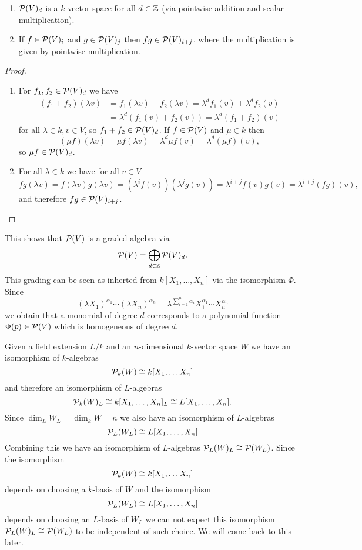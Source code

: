 \begin{lem}
 \begin{enumerate}[label=\emph{\alph*)},leftmargin=*]
  \item
   $\mathcal{P}(V)_d$ is a $k$-vector space for all $d \in \mathbb{Z}$ (via pointwise addition and scalar multiplication).
  \item
   If $f \in \mathcal{P}(V)_i$ and $g \in \mathcal{P}(V)_j$  then $fg \in \mathcal{P}(V)_{i+j}$, where the multiplication is given by pointwise multiplication.
 \end{enumerate}
\end{lem}
\begin{proof}
 \begin{enumerate}[label=\emph{\alph*)},leftmargin=*]
  \item For $f_1, f_2 \in \mathcal{P}(V)_d$ we have
   \begin{align*}
    (f_1+f_2)(\lambda v)
    &= f_1(\lambda v) + f_2(\lambda v)
    = \lambda^d f_1(v) + \lambda^d f_2(v) \\
    &= \lambda^d (f_1(v) + f_2(v))
    = \lambda^d (f_1 + f_2)(v)
   \end{align*}
   for all $\lambda \in k, v \in V$, so $f_1 + f_2 \in \mathcal{P}(V)_d$. If $f \in \mathcal{P}(V)$ and $\mu \in k$ then
   \[
    (\mu f)(\lambda v) = \mu f(\lambda v) = \lambda^d \mu f(v) = \lambda^d (\mu f)(v),
   \]
   so $\mu f \in \mathcal{P}(V)_d$.
  \item
   For all $\lambda \in k$ we have for all $v \in V$
   \[
    fg(\lambda v)
    = f(\lambda v) g(\lambda v)
    = \left(\lambda^i f(v)\right)\left(\lambda^j g(v)\right)
    = \lambda^{i+j} f(v) g(v)
    = \lambda^{i+j} (fg)(v),
   \]
   and therefore $fg \in \mathcal{P}(V)_{i+j}$.
  \qedhere
 \end{enumerate}
\end{proof}

This shows that $\mathcal{P}(V)$ is a graded algebra via
\[
  \mathcal{P}(V) = \bigoplus_{d \in \mathbb{Z}} \mathcal{P}(V)_d.
\]
This grading can be seen as inherted from $k[X_1, \dotsc, X_n]$ via the isomorphism $\Phi$. Since
\[
 (\lambda X_1)^{\alpha_1} \dotsm (\lambda X_n)^{\alpha_n}
 = \lambda^{\sum_{i=1}^n \alpha_i} X_1^{\alpha_1} \dotsm X_n^{\alpha_n}
\]
we obtain that a monomial of degree $d$ corresponds to a polynomial function $\Phi(p) \in \mathcal{P}(V)$ which is homogeneous of degree $d$.


Given a field extension $L/k$ and an $n$-dimensional $k$-vector space $W$ we have an isomorphism of $k$-algebras
\[
 \mathcal{P}_k(W) \cong k[X_1, \dotsc X_n]
\]
and therefore an isomorphism of $L$-algebras
\[
 \mathcal{P}_k(W)_L \cong k[X_1, \dotsc, X_n]_L \cong L[X_1, \dotsc, X_n].
\]
Since $\dim_L W_L = \dim_k W = n$ we also have an isomorphism of $L$-algebras
\[
 \mathcal{P}_L(W_L) \cong L[X_1, \dotsc, X_n]
\]
Combining this we have an isomorphism of $L$-algebras $\mathcal{P}_L(W)_L \cong \mathcal{P}(W_L)$. Since the isomorphism
\[
 \mathcal{P}_k(W) \cong k[X_1, \dotsc X_n]
\]
depends on choosing a $k$-basis of $W$ and the isomorphism
\[
 \mathcal{P}_L(W_L) \cong L[X_1, \dotsc, X_n]
\]
depends on choosing an $L$-basis of $W_L$ we can not expect this isomorphism $\mathcal{P}_L(W)_L \cong \mathcal{P}(W_L)$ to be independent of such choice. We will come back to this later.


